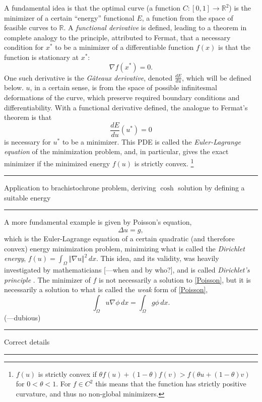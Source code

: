 \documentclass[11pt,a4paper]{memoir}
\newcommand{\norm}[1]{\left\Vert#1\right\Vert}
\newcommand{\todo}[1]{\vskip 0.1in \hrule \vskip 0.03in {#1} \vskip 0.03in \hrule \vskip 0.1in}
\begin{document}

A fundamental idea is that the optimal curve (a function $C:[0,1]\rightarrow \mathbb{R}^2$) is the minimizer of a certain ``energy'' functional $E$,
a function from the space of feasible curves to $\mathbb{R}$. A \textit{functional derivative} is defined, leading to a theorem in complete analogy to the principle, attributed to Fermat, that a necessary condition for $x^*$ to be a minimizer of a differentiable function $f(x)$ is that the function is stationary at $x^*$:
    $$\nabla f(x^*) = 0.$$
One such derivative is the \textit{G\^ateaux derivative}, denoted
$\frac{dE}{du}$, which will be defined below.
$u$, in a certain sense, is from the space of possible infinitesmal deformations of the curve, which preserve required boundary conditions and differentiability. With a functional derivative defined, the analogue to Fermat's theorem is that
    $$\frac{dE}{du}(u^*) = 0$$
is necessary for $u^*$ to be a minimizer. This PDE is called the \textit{Euler-Lagrange equation} of the minimization problem, and, in particular, gives the
exact minimizer if the minimized energy $f(u)$ is strictly convex.
\footnote{
$f(u)$ is strictly convex if $\theta f(u) + (1-\theta)f(v) > f(\theta u + (1 - \theta) v)$ for $0 < \theta < 1$. For $f \in C^2$ this means that the function has strictly positive curvature, and thus no non-global minimizers.
}
\todo{Application to brachistochrone problem, deriving $\cosh$ solution by defining a suitable energy}


A more fundamental example is given by Poisson's equation,
\begin{equation}\label{Poisson}
    \Delta u = g,
\end{equation}
which is the Euler-Lagrange equation of a certain quadratic (and therefore convex) energy minimization problem, minimizing what is called the \textit{Dirichlet energy},
$f(u) = \int_\Omega \norm{\nabla u}^2\,dx.$
This idea, and its validity, was heavily investigated by mathematicians [---when and by who?], and is called \textit{Dirichlet's principle} \cite{dirichlet_principle}. The minimizer of $f$ is not necessarily a solution to \eqref{Poisson}, but it is necessarily a solution to what is called
the \textit{weak} form of \eqref{Poisson},
\begin{equation}\label{WeakPoisson}
    \int_\Omega u \nabla \phi\,dx  = \int_\Omega g\phi\,dx.
\end{equation}
(---dubious)
\todo{Correct details}
\end{document}
